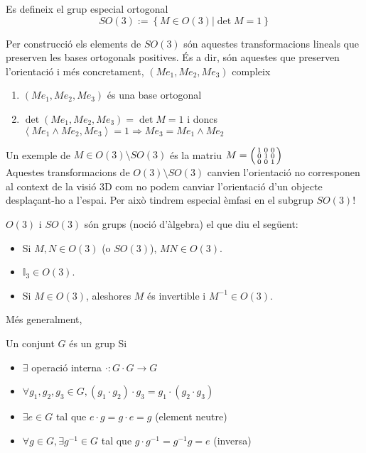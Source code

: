 \documentclass[../main.tex]{subfiles}
\begin{document}
	\begin{definicio}
	    Es defineix el grup especial ortogonal
	    \begin{displaymath}
	        SO(3) := \left\{M \in O(3) | \det{M} = 1\right\}
	    \end{displaymath}
	\end{definicio}

	Per construcció els elements de $SO(3)$ són aquestes transformacions lineals que preserven les
	bases ortogonals positives. És a dir, són aquestes que preserven l'orientació i més concretament,
	$\left(Me_1, Me_2, Me_3\right)$ compleix

	\begin{enumerate}
	    \item $\left(Me_1, Me_2, Me_3\right)$ és una base ortogonal
	    \item $\det{\left(Me_1, Me_2, Me_3\right)} = \det{M} = 1$ i doncs $\left\langle Me_1\wedge Me_2, Me_3\right\rangle = 1 \Rightarrow Me_3 = Me_1\wedge Me_2$
	\end{enumerate}

	Un exemple de $M \in O(3)\setminus SO(3)$ és la matriu $M = \begin{psmallmatrix}
	    1 & 0 & 0\\
	    0 & 1 & 0\\
	    0 & 0 & 1
	\end{psmallmatrix}$\\

	Aquestes transformacions de $O(3)\setminus SO(3)$ canvien l'orientació no corresponen al context de
	la visió 3D com no podem canviar l'orientació d'un objecte desplaçant-ho a l'espai. Per això tindrem
	especial èmfasi en el subgrup $SO(3)$!

	\begin{obs}
	    $O(3)$ i $SO(3)$ són grups (noció d'àlgebra) el que diu el següent:
	    \begin{itemize}
	        \item Si $M, N \in O(3)$ (o $SO(3)$), $MN \in O(3)$.
	        \item $\mathbb{I}_3 \in O(3)$.
	        \item Si $M \in O(3)$, aleshores $M$ és invertible i $M^{-1} \in O(3)$.
	    \end{itemize}
	\end{obs}
	Més generalment,
	\begin{definicio}
	    Un conjunt $G$ és un grup Si
	    \begin{itemize}
	        \item $\exists$ operació interna $\cdot : G\cdot G \to G$
	        \item $\forall g_1, g_2, g_3 \in G, (g_1\cdot g_2) \cdot g_3 = g_1\cdot (g_2 \cdot g_3)$
	        \item $\exists e \in G$ tal que $e\cdot g = g \cdot e = g$ (element neutre)
	        \item $\forall g \in G, \exists g^{-1} \in G$ tal que $ g\cdot g^{-1} = g^{-1}g = e$ (inversa)
	    \end{itemize}
	\end{definicio}
\end{document}

